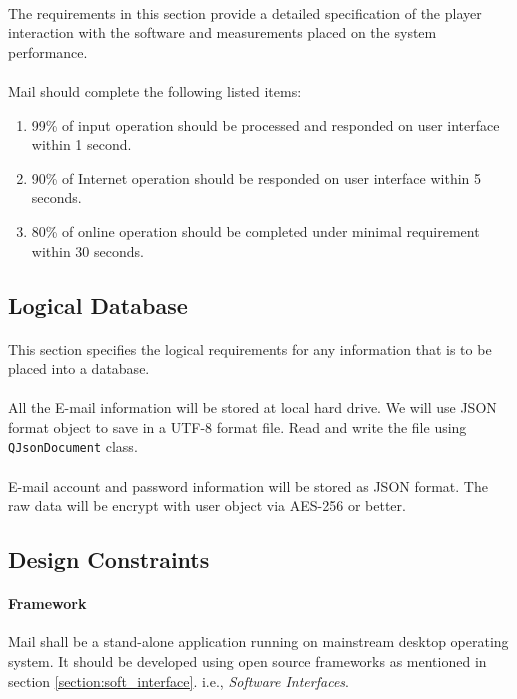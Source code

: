 \documentclass[11pt,a4paper]{article}
\begin{document}
        	\paragraph{} The requirements in this section provide a detailed specification of the player interaction with the software and measurements placed on the system performance.
	        \paragraph{} Mail should complete the following listed items:
	        \begin{enumerate}
	        	\item 99\% of input operation should be processed and responded on user interface within 1 second.
		        \item 90\% of Internet operation should be responded on user interface within 5 seconds.
		        \item 80\% of online operation should be completed under minimal requirement within 30 seconds.
	        \end{enumerate}
        \subsection{Logical Database}
        	\paragraph{} This section specifies the logical requirements for any information that is to be placed into a database.
        	\paragraph{} All the E-mail information will be stored at local hard drive. We will use JSON format object to save in a UTF-8 format file. Read and write the file using \texttt{QJsonDocument} class.
	        \paragraph{} E-mail account and password information will be stored as JSON format. The raw data will be encrypt with user object via AES-256 or better.
        \subsection{Design Constraints}
        	\paragraph{Framework} Mail shall be a stand-alone application running on mainstream desktop operating system. It should be developed using open source frameworks as mentioned in section \ref{section:soft_interface}. i.e., \emph{Software Interfaces}.
\end{document}
